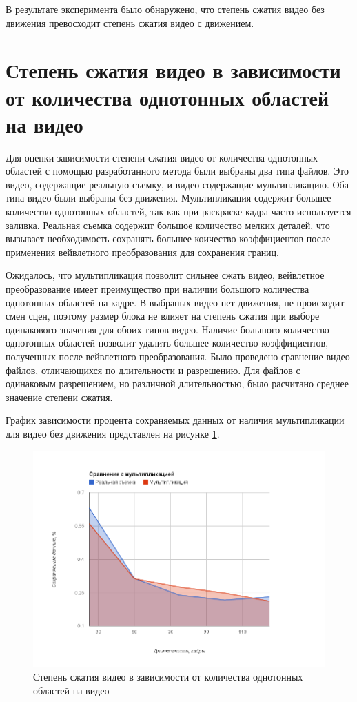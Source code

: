 В результате эксперимента было обнаружено, что степень сжатия видео без движения превосходит степень сжатия видео с движением.

\section{Степень сжатия видео в зависимости от количества однотонных областей на видео}

Для оценки зависимости степени сжатия видео от количества однотонных областей с помощью разработанного метода были выбраны два типа файлов. 
Это видео, содержащие реальную съемку, и видео содержащие мультипликацию. Оба типа видео были выбраны без движения.
Мультипликация содержит большее количество однотонных областей, так как при раскраске кадра часто используется заливка. 
Реальная съемка содержит большое количество мелких деталей, что вызывает необходимость сохранять большее коичество коэффициентов после применения 
вейвлетного преобразования для сохранения границ.

Ожидалось, что мультипликация позволит сильнее сжать видео, вейвлетное преобразование имеет преимущество при наличии большого количества однотонных областей на кадре.
В выбраных видео нет движения, не происходит смен сцен, поэтому размер блока не влияет на степень сжатия при выборе одинакового значения для обоих типов видео.
Наличие большого количество однотонных областей позволит удалить большее количество коэффициентов, полученных после вейвлетного преобразования.
Было проведено сравнение видео файлов, отличающихся по длительности и разрешению. Для файлов с одинаковым разрешением, но различной длительностью, было расчитано
среднее значение степени сжатия.

График зависимости процента сохраняемых данных от наличия мультипликации для видео без движения представлен на рисунке \ref{fig:img2}.

\begin{figure}[ht]
  \centering
  \includegraphics[scale=0.6]{inc/graphics/image2.png}
  \caption{Степень сжатия видео в зависимости от количества однотонных областей на видео}
  \label{fig:img2}
\end{figure}

